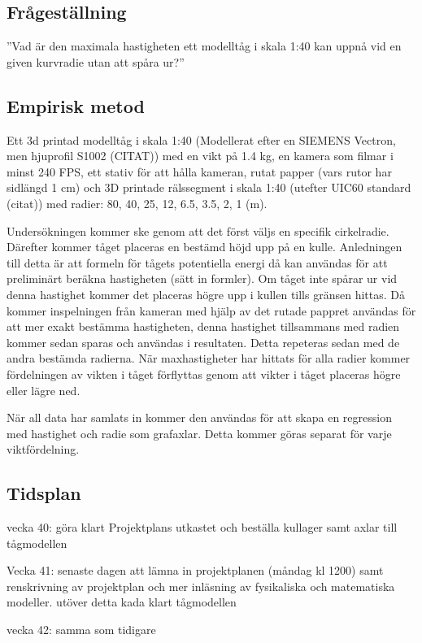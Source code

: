 \subsection{Frågeställning}
''Vad är den maximala hastigheten ett modelltåg i skala 1:40 kan uppnå vid en given kurvradie utan att spåra ur?''

\subsection{Empirisk metod}
Ett 3d printad modelltåg i skala 1:40 (Modellerat efter en SIEMENS Vectron, men hjuprofil S1002 (CITAT)) med en vikt på \num{1.4} kg, en kamera som filmar i minst 240 FPS, ett stativ för att hålla kameran, rutat papper (vars rutor har sidlängd 1 cm) och 3D printade rälssegment i skala 1:40 (utefter UIC60 standard (citat)) med radier: 80, 40, 25, 12, \num{6.5}, \num{3.5}, 2, 1 (m). 

Undersökningen kommer ske genom att det först väljs en specifik cirkelradie. Därefter kommer tåget placeras en bestämd höjd upp på en kulle. Anledningen till detta är att formeln för tågets potentiella energi då kan användas för att preliminärt beräkna hastigheten (sätt in formler). Om tåget inte spårar ur vid denna hastighet kommer det placeras högre upp i kullen tills gränsen hittas. Då kommer inspelningen från kameran med hjälp av det rutade pappret användas för att mer exakt bestämma hastigheten, denna hastighet tillsammans med radien kommer sedan sparas och användas i resultaten. Detta repeteras sedan med de andra bestämda radierna. När maxhastigheter har hittats för alla radier kommer fördelningen av vikten i tåget förflyttas genom att vikter i tåget placeras högre eller lägre ned. 

När all data har samlats in kommer den användas för att skapa en regression med hastighet och radie som grafaxlar. Detta kommer göras separat för varje viktfördelning. 

\subsection{Tidsplan}
vecka 40:
göra klart Projektplans utkastet och beställa kullager samt axlar till tågmodellen

Vecka 41: senaste dagen att lämna in projektplanen (måndag kl 1200) samt renskrivning av projektplan och mer inläsning av fysikaliska och matematiska modeller. utöver detta kada klart tågmodellen

vecka 42: samma som tidigare


